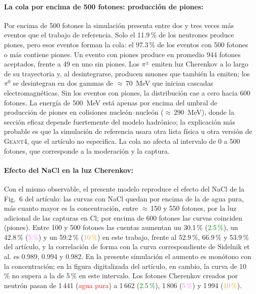 \paragraph{La cola por encima de 500 fotones: producción de piones:} Por encima de 500 fotones la simulación presenta entre dos y tres veces más eventos que el trabajo de referencia. Solo el 11.9\,\% de los neutrones produce piones, pero esos eventos forman la cola: el 97.3\,\% de los eventos con 500 fotones o más contiene piones. Un evento con piones produce en promedio 944 fotones aceptados, frente a 49 en uno sin piones. Los $\pi^{\pm}$ emiten luz Cherenkov a lo largo de su trayectoria y, al desintegrarse, producen muones que también la emiten; los $\pi^{0}$ se desintegran en dos gammas de $\approx$\,70~MeV que inician cascadas electromagnéticas. Sin los eventos con piones, la distribución cae a cero hacia 600 fotones. La energía de 500~MeV está apenas por encima del umbral de producción de piones en colisiones nucleón--nucleón ($\approx$\,290~MeV), donde la sección eficaz depende fuertemente del modelo hadrónico; la explicación más probable es que la simulación de referencia usara otra lista física u otra versión de \textsc{Geant4}, que el artículo no especifica. La cola no afecta al intervalo de 0 a 500 fotones, que corresponde a la moderación y la captura.

\paragraph{Efecto del NaCl en la luz Cherenkov:} Con el mismo observable, el presente modelo reproduce el efecto del NaCl de la Fig.~6 del artículo: las curvas con NaCl quedan por encima de la de agua pura, más cuanto mayor es la concentración, entre $\approx$\,150 y 550 fotones, por la luz adicional de las capturas en Cl; por encima de 600 fotones las curvas coinciden (piones). Entre 100 y 500 fotones las cuentas aumentan un 30.1\,\% (\textcolor{green}{2.5\,\%}), un 42.8\,\% (\textcolor{violet}{5\,\%}) y un 59.2\,\% (\textcolor{orange}{10\,\%}) en este trabajo, frente al 52.9\,\%, 66.9\,\% y 53.9\,\% del artículo, y la correlación de forma con la curva correspondiente de Sidelnik et al. es 0.989, 0.994 y 0.982. En la presente simulación el aumento es monótono con la concentración; en la figura digitalizada del artículo, en cambio, la curva de 10\,\% no supera a la de 5\,\% en este intervalo. Los fotones Cherenkov creados por neutrón pasan de 1\,441 (\textcolor{red}{agua pura}) a 1\,662 (\textcolor{green}{2.5\,\%}), 1\,806 (\textcolor{violet}{5\,\%}) y 1\,994 (\textcolor{orange}{10\,\%}).

